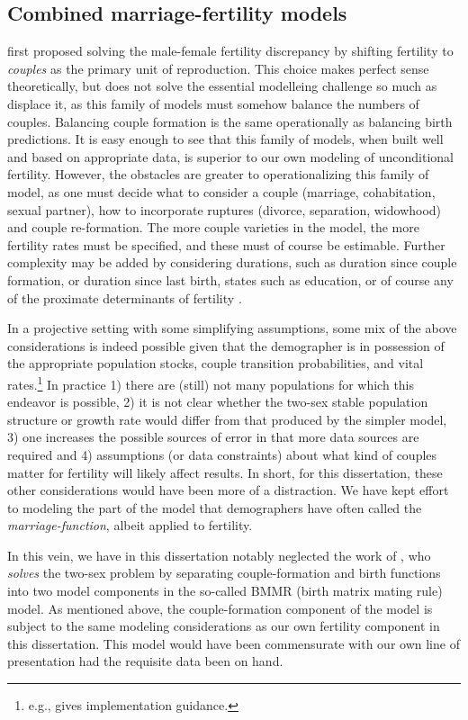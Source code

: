 \subsection{Combined marriage-fertility models} 
\citet{karmel1947relations}
first proposed solving the male-female fertility discrepancy by shifting
fertility to \textit{couples} as the primary unit of reproduction. This choice
makes perfect sense theoretically, but does not solve the essential modelleing
challenge so much as displace it, as this family of models
must somehow balance the numbers of couples. Balancing couple formation is the
same operationally as balancing birth predictions. It is easy enough to see that
this family of models, when built well and based on appropriate data, is
superior to our own modeling of unconditional fertility. However, the
obstacles are greater to operationalizing this family of model, as one must
decide what to consider a couple (marriage, cohabitation, sexual
partner), how to incorporate ruptures (divorce, separation, widowhood) and
couple re-formation. The more couple varieties in the model, the more fertility
rates must be specified, and these must of course be estimable. Further
complexity may be added by considering durations, such as duration since 
couple formation, or duration since last birth, states such as
education, or of course any of the proximate determinants of
fertility \citep{bongaarts1982fertility, bongaarts1978framework,
bongaarts1983fertility}. 

In a projective setting with some simplifying assumptions, some mix of the above
considerations is indeed possible given that the demographer is in possession of
the appropriate population stocks, couple transition probabilities, and
vital rates.\footnote{e.g., \citep{schoen1987modeling} gives implementation
guidance.} In practice 1) there are (still) not many populations for which this
endeavor is possible, 2) it is not clear whether the two-sex stable population
structure or growth rate would differ from that produced by the simpler model,
3) one increases the possible sources of error in that more data sources are
required and 4) assumptions (or data constraints) about what kind of couples
matter for fertility will likely affect results. In short, for this
dissertation, these other considerations would have been more of a distraction.
We have kept effort to modeling the part of the model that demographers have
often called the \textit{marriage-function}, albeit applied to fertility.

In this vein, we have in this dissertation notably neglected the work of
\citet{pollak1986reformulation, pollak1987two, pollak1990two}, who
\textit{solves} the two-sex problem by separating couple-formation and birth
functions into two model components in the so-called BMMR (birth matrix mating
rule) model. As mentioned above, the couple-formation component of the model is
subject to the same modeling considerations as our own fertility component in
this dissertation. This model would have been commensurate with our own line of
presentation had the requisite data been on hand.

